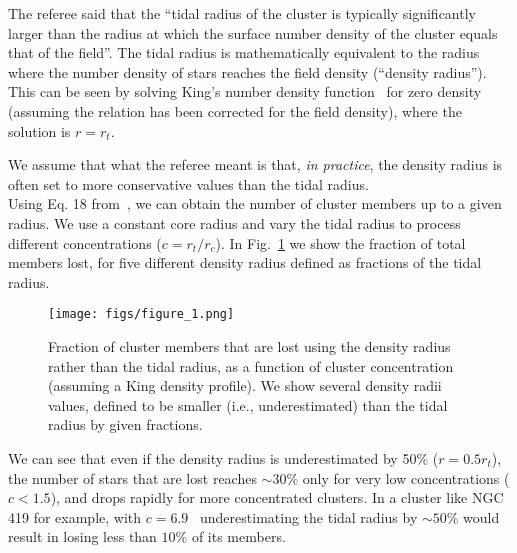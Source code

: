 \documentclass{article}
\begin{document}
The referee said that the ``tidal radius of the cluster is typically
significantly larger than the radius at which the surface number density of the
cluster equals that of the field''.
%
The tidal radius is mathematically equivalent to the radius where the number
density of stars reaches the field density (``density radius''). This can be
seen by solving King's number density function~\citep[][Eq. 14]{king_1962} for
zero density (assuming the relation has been corrected for the field
density), where the solution is $r=r_t$.

We assume that what the referee meant is that, \emph{in practice}, the density
radius is often set to more conservative values than the tidal radius.\\

Using Eq. 18 from~\cite{king_1962}, we can obtain the number of
cluster members up to a given radius. We use a constant core radius and vary
the tidal radius to process different concentrations ($c{=r}_t/r_c$).
%
In Fig.~\ref{fig:frac_memb_lost} we show the fraction of total members lost, for
five different density radius defined as fractions of the tidal radius.
%
\begin{figure}[t]
    \centering
    \texttt{[image: figs/figure\_1.png]}
    \caption{Fraction of cluster members that are lost using the density radius
    rather than the tidal radius, as a function of cluster concentration 
    (assuming a King density profile). We show several density radii values,
    defined to be smaller (i.e., underestimated) than the tidal radius by
    given fractions.}
    \label{fig:frac_memb_lost}
\end{figure}
%
We can see that even if the density radius is underestimated by 50\% 
($r=0.5 r_t$), the number of stars that are lost reaches $\sim30\%$ only for
very low concentrations ($c<1.5$), and drops rapidly for more concentrated
clusters.
%
In a cluster like NGC 419 for example, with $c=6.9$~\citep{Goudfrooij_2014}
underestimating the tidal radius by $\sim50\%$ would result in 
losing less than $10\%$ of its members.
\end{document}
